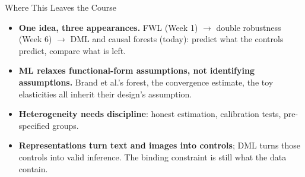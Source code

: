 \documentclass[aspectratio=169,11pt,xcolor=dvipsnames]{beamer}
\begin{document}
\begin{frame}{Where This Leaves the Course}
\begin{itemize}\itemsep4pt
  \item \textbf{One idea, three appearances.} FWL (Week 1) $\to$ double robustness (Week 6)
        $\to$ DML and causal forests (today): predict what the controls predict, compare what is left.
  \item \textbf{ML relaxes functional-form assumptions, not identifying assumptions.} Brand et al.'s
        forest, the convergence estimate, the toy elasticities all inherit their
        design's assumption.
  \item \textbf{Heterogeneity needs discipline}: honest estimation, calibration tests,
        pre-specified groups.
  \item \textbf{Representations turn text and images into controls}; DML turns those controls
        into valid inference. The binding constraint is still what the data contain.
\end{itemize}
\end{frame}
\end{document}
